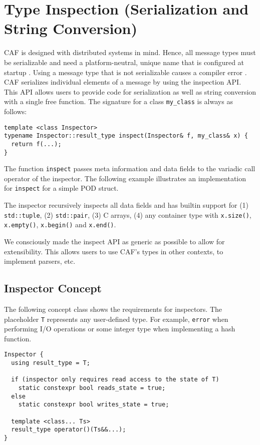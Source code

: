 \section{Type Inspection (Serialization and String Conversion)}
\label{type-inspection}

CAF is designed with distributed systems in mind. Hence, all message types
must be serializable and need a platform-neutral, unique name that is
configured at startup . Using a message type that
is not serializable causes a compiler error . CAF
serializes individual elements of a message by using the inspection API. This
API allows users to provide code for serialization as well as string conversion
with a single free function. The signature for a class \lstinline^my_class^ is
always as follows:

\begin{lstlisting}
template <class Inspector>
typename Inspector::result_type inspect(Inspector& f, my_class& x) {
  return f(...);
}
\end{lstlisting}

The function \lstinline^inspect^ passes meta information and data fields to the
variadic call operator of the inspector. The following example illustrates an
implementation for \lstinline^inspect^ for a simple POD struct.


The inspector recursively inspects all data fields and has builtin support for
(1) \lstinline^std::tuple^, (2) \lstinline^std::pair^, (3) C arrays, (4) any
container type with \lstinline^x.size()^, \lstinline^x.empty()^,
\lstinline^x.begin()^ and \lstinline^x.end()^.

We consciously made the inspect API as generic as possible to allow for
extensibility. This allows users to use CAF's types in other contexts, to
implement parsers, etc.

\subsection{Inspector Concept}

The following concept class shows the requirements for inspectors. The
placeholder \lstinline^T^ represents any user-defined type. For example,
\lstinline^error^ when performing I/O operations or some integer type when
implementing a hash function.

\begin{lstlisting}
Inspector {
  using result_type = T;

  if (inspector only requires read access to the state of T)
    static constexpr bool reads_state = true;
  else
    static constexpr bool writes_state = true;

  template <class... Ts>
  result_type operator()(Ts&&...);
}
\end{lstlisting}


